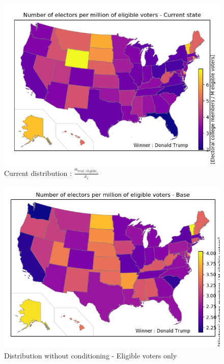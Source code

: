 \documentclass[a4paper,10pt,calibri,oneside,openany, twocolumn]{report}
\theoremstyle{break}
\begin{document}
\begin{figure}[H]
	\centering
	\includegraphics[width=\linewidth]{mapCurrentEligible}
	\caption{Current distribution : $\frac{\alpha_{real,eligible_i}}{x_i}$}
\end{figure}
\begin{figure}[H]
	\centering
	\includegraphics[width=\linewidth]{mapEligibleBase}
	\caption{Distribution without conditioning - Eligible voters only}
\end{figure}
\end{document}
